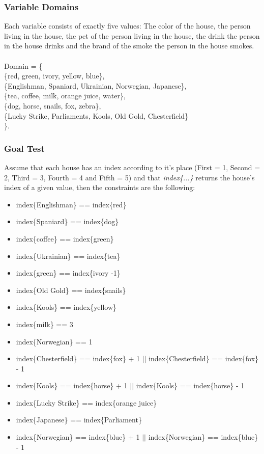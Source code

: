 \documentclass[paper=a4, fontsize=11pt]{scrartcl} %
\numberwithin{equation}{section} %
\numberwithin{figure}{section} %
\numberwithin{table}{section} %
\begin{document}
\subsubsection{Variable Domains}
Each variable consists of exactly five values: The color of the house, the person living in the house, the pet of the person living in the house, the drink the person in the house drinks and the brand of the smoke the person in the house smokes.\\\\
Domain = \{\\
\{red, green, ivory, yellow, blue\},\\
\{Englishman, Spaniard, Ukrainian, Norwegian, Japanese\},\\
\{tea, coffee, milk, orange juice, water\},\\
\{dog, horse, snails, fox, zebra\},\\
\{Lucky Strike, Parliaments, Kools, Old Gold, Chesterfield\}\\
\}.

\subsubsection{Goal Test}
Assume that each house has an index according to it's place (First = 1, Second = 2, Third = 3, Fourth = 4 and Fifth = 5) and that \textit{index\{...\}} returns the house's index of a given value, then the constraints are the following:
\begin{itemize}
\item index\{Englishman\} == index\{red\}
\item index\{Spaniard\} == index\{dog\}
\item index\{coffee\} == index\{green\}
\item index\{Ukrainian\} == index\{tea\}
\item index\{green\} == index\{ivory -1\}
\item index\{Old Gold\} == index\{snails\}
\item index\{Kools\} == index\{yellow\}
\item index\{milk\} == 3
\item index\{Norwegian\} == 1
\item index\{Chesterfield\} == index\{fox\} + 1 $\vert\vert$ index\{Chesterfield\} == index\{fox\} - 1
\item index\{Kools\} == index\{horse\} + 1 $\vert\vert$ index\{Kools\} == index\{horse\} - 1
\item index\{Lucky Strike\} == index\{orange juice\}
\item index\{Japanese\} == index\{Parliament\}
\item index\{Norwegian\} == index\{blue\} + 1 $\vert\vert$ index\{Norwegian\} == index\{blue\} - 1
\end{itemize}
\end{document}
